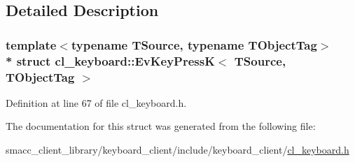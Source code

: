 \subsection{Detailed Description}
\subsubsection*{template$<$typename T\+Source, typename T\+Object\+Tag$>$\\*
struct cl\+\_\+keyboard\+::\+Ev\+Key\+Press\+K$<$ T\+Source, T\+Object\+Tag $>$}



Definition at line 67 of file cl\+\_\+keyboard.\+h.



The documentation for this struct was generated from the following file\+:\begin{DoxyCompactItemize}
\item 
smacc\+\_\+client\+\_\+library/keyboard\+\_\+client/include/keyboard\+\_\+client/\hyperlink{cl__keyboard_8h}{cl\+\_\+keyboard.\+h}\end{DoxyCompactItemize}
